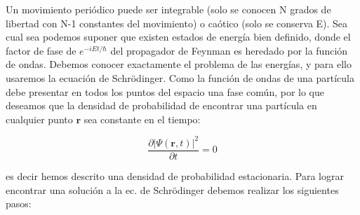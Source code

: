 \documentclass[12pt,a4paper]{article}
\numberwithin{equation}{section}
\numberwithin{figure}{section}
\newcommand{\parciales}[2]{\frac{\partial #1}{\partial #2}}
\newcommand{\rn}{\mathbf{r}}
\begin{document}


Un movimiento periódico puede ser integrable (solo se conocen N grados de libertad con N-1 constantes del movimiento) o caótico (solo se conserva E). Sea cual sea podemos suponer que existen estados de energía bien definido, donde el factor de fase de $e^{-iEt/\hbar}$ del propagador de Feynman es heredado por la función de ondas. Debemos conocer exactamente el problema de las energías, y para ello usaremos la ecuación de Schrödinger. Como la función de ondas de una partícula debe presentar en todos los puntos del espacio una fase común, por lo que deseamos que la densidad de probabilidad de encontrar una partícula en cualquier punto $\rn$ sea constante en el tiempo:

\begin{equation}
\parciales{| \Psi (\rn,t)|^2}{t} = 0 \label{Ec:11.044}
\end{equation}

es decir hemos descrito una densidad de probabilidad estacionaria. Para lograr encontrar una solución a la ec. de Schrödinger debemos realizar los siguientes pasos:
\end{document}
